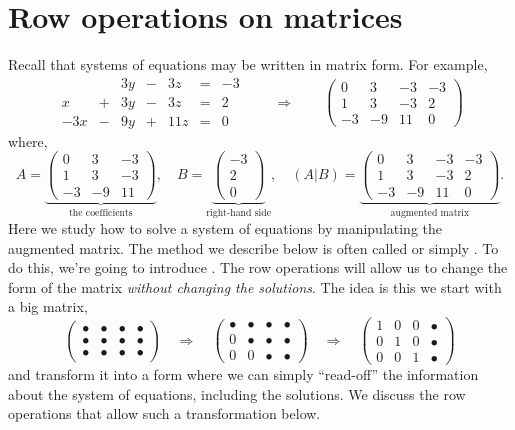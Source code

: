 \documentclass{ximera}
\begin{document}
\section{Row operations on matrices}
Recall that systems of equations may be written in matrix form. For example, 
\[
\begin{array}{ccccccc}
       & & 3y &-& 3z &=& -3 \\
     x& +&3y&-&3z&=&2\\
     -3x& -&9y&+&11z&=&0
\end{array}
\qquad\Longrightarrow\qquad
\left(\begin{array}{ccc|c}
  0 &   3 & -3 & -3 \\
  1 &   3 & -3 & 2  \\
  -3& -9  & 11 & 0
\end{array}\right)
\]
where, 
\[
A = \underbrace{\begin{pmatrix}
  0 & 3 & -3  \\
  1 &  3  & -3 \\
 -3 & -9 & 11
\end{pmatrix}}_{\text{the coefficients}},
\quad
B =
\underbrace{\begin{pmatrix}
 -3\\ 2 \\ 0
\end{pmatrix}}_{\text{right-hand side}},
\quad
\left(A|B\right) = \underbrace{\left(\begin{array}{ccc|c}
  0 &   3 & -3 & -3 \\
  1 &   3 & -3 & 2  \\
  -3& -9  & 11 & 0
\end{array}\right)}_{\text{augmented matrix}}.
\]
Here we study how to solve a system of equations by manipulating the augmented matrix. The
method we describe below is often called 
or simply . To do this, we're going to introduce
. The row operations will allow us to change the
form of the matrix \emph{without changing the solutions}. The idea is
this we start with a big matrix,
\[
\begin{pmatrix}
  \bullet & \bullet & \bullet & \bullet \\
  \bullet & \bullet & \bullet & \bullet \\
  \bullet & \bullet & \bullet & \bullet
\end{pmatrix}
\quad
\Rightarrow
\quad
\begin{pmatrix}
  \bullet & \bullet & \bullet & \bullet \\
     0   & \bullet & \bullet & \bullet \\
     0  &    0 & \bullet & \bullet
\end{pmatrix}
\quad
\Rightarrow
\quad
\begin{pmatrix}
  1 & 0 & 0  & \bullet \\
     0   & 1  &  0 & \bullet \\
     0  &    0 & 1 & \bullet
\end{pmatrix}
\]
and transform it into a form where we can simply ``read-off'' the
information about the system of equations, including the solutions.  We
discuss the row operations that allow such a transformation below.
\end{document}
